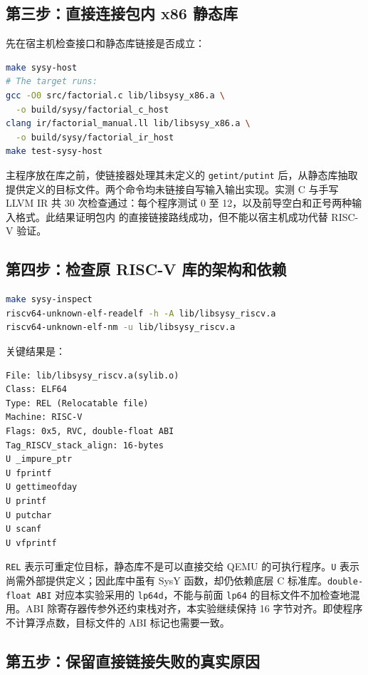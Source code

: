 \documentclass[UTF8,a4paper,12pt]{ctexart}
\begin{document}
\subsection{第三步：直接连接包内 x86 静态库}

先在宿主机检查接口和静态库链接是否成立：

\begin{lstlisting}[language=bash]
make sysy-host
# The target runs:
gcc -O0 src/factorial.c lib/libsysy_x86.a \
  -o build/sysy/factorial_c_host
clang ir/factorial_manual.ll lib/libsysy_x86.a \
  -o build/sysy/factorial_ir_host
make test-sysy-host
\end{lstlisting}

主程序放在库之前，使链接器处理其未定义的 \texttt{getint/putint} 后，从静态库抽取提供定义的目标文件。两个命令均未链接自写输入输出实现。实测 C 与手写 LLVM IR 共 30 次检查通过：每个程序测试 0 至 12，以及前导空白和正号两种输入格式。此结果证明包内  的直接链接路线成功，但不能以宿主机成功代替 RISC-V 验证。

\subsection{第四步：检查原 RISC-V 库的架构和依赖}

\begin{lstlisting}[language=bash]
make sysy-inspect
riscv64-unknown-elf-readelf -h -A lib/libsysy_riscv.a
riscv64-unknown-elf-nm -u lib/libsysy_riscv.a
\end{lstlisting}

关键结果是：

\begin{lstlisting}
File: lib/libsysy_riscv.a(sylib.o)
Class: ELF64
Type: REL (Relocatable file)
Machine: RISC-V
Flags: 0x5, RVC, double-float ABI
Tag_RISCV_stack_align: 16-bytes
U _impure_ptr
U fprintf
U gettimeofday
U printf
U putchar
U scanf
U vfprintf
\end{lstlisting}

\texttt{REL} 表示可重定位目标，静态库不是可以直接交给 QEMU 的可执行程序。\texttt{U} 表示尚需外部提供定义；因此库中虽有 SysY 函数，却仍依赖底层 C 标准库。\texttt{double-float ABI} 对应本实验采用的 \texttt{lp64d}，不能与前面 \texttt{lp64} 的目标文件不加检查地混用。ABI 除寄存器传参外还约束栈对齐，本实验继续保持 16 字节对齐\cite{riscv-abi}。即使程序不计算浮点数，目标文件的 ABI 标记也需要一致。

\subsection{第五步：保留直接链接失败的真实原因}
\end{document}
